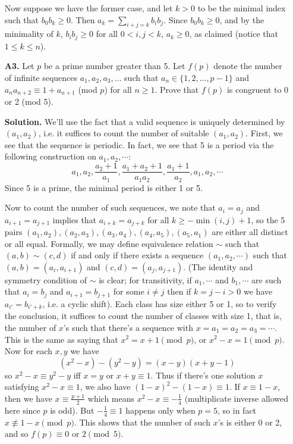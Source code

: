 \documentclass[11pt,a4paper]{article}
\begin{document}
\begin{enumerate}
        Now suppose we have the former case, and let $k>0$ to be the minimal index such that $b_0b_k\ge 0$. 
        Then $a_k = \sum_{i+j=k} b_ib_j$. 
        Since $b_0b_k\ge 0$, and by the minimality of $k$, $b_ib_j\ge 0$ for all $0<i, j<k$, 
        $a_k\ge 0$, as claimed (notice that $1\le k\le n$). 
		
		\item [\textbf{A3.}]
		Let $p$ be a prime number greater than 5. Let $f(p)$ denote the number of infinite sequences $a_1, a_2, a_3,\ldots$ such that $a_n \in \{1, 2,\ldots, p-1\}$ and $a_na_{n+2}\equiv1+a_{n+1}$ (mod $p$) for all $n\geq 1.$ Prove that $f(p)$ is congruent to 0 or 2 (mod 5).
		
		\textbf{Solution.} 
		We'll use the fact that a valid sequence is uniquely determined by $(a_1, a_2)$, i.e. it suffices to count the number of suitable $(a_1, a_2)$.
		First, we see that the sequence is periodic. 
		In fact, we see that 5 is a period via the following construction on $a_1, a_2, \cdots$:
		\[
		a_1, a_2, \frac{a_2 + 1}{a_1}, \frac{a_1 + a_2 + 1}{a_1a_2}, \frac{a_1 + 1}{a_2}, a_1, a_2, \cdots
		\]
		Since 5 is a prime, the minimal period is either 1 or 5.
		
		Now to count the number of such sequences, we note that $a_i=a_j$ and $a_{i+1}=a_{j+1}$ implies that $a_{i+k}=a_{j+k}$ for all $k\ge -\min(i, j) + 1$, 
		so the 5 pairs $(a_1, a_2), (a_2, a_3), (a_3, a_4), (a_4, a_5), (a_5, a_1)$ are either all distinct or all equal. 
		Formally, we may define equivalence relation $\sim$ such that $(a, b)\sim (c, d)$ if and only if there exists a sequence 
		$(a_1, a_2, \cdots)$ such that $(a, b)=(a_i, a_{i+1})$ and $(c, d)=(a_j, a_{j+1})$. 
		(The identity and symmetry condition of $\sim$ is clear; for transitivity, if $a_1, \cdots$ and $b_1, \cdots$ are such that $a_i=b_j$ and $a_{i+1}=b_{j+1}$ for some $i\neq j$ then if $k=j-i > 0$ we have $a_{i'}=b_{i'+k}$, 
		i.e. a cyclic shift). 
		Each class has size either 5 or 1, so to verify the conclusion, it suffices to count the number of classes with size 1, 
		that is, the number of $x$'s such that there's a sequence with $x=a_1=a_2=a_3=\cdots$. 
		This is the same as saying that $x^2=x+1\pmod{p}$, 
		or $x^2-x=1\pmod{p}$. 
		Now for each $x, y$ we have 
		\[
		(x^2-x)-(y^2-y)=(x-y)(x+y-1)
		\]
		so $x^2-x\equiv y^2-y$ iff $x=y$ or $x+y\equiv 1$. Thus if there's one solution $x$ satisfying $x^2-x\equiv 1$, 
		we also have $(1-x)^2-(1-x)\equiv 1$. If $x\equiv 1-x$, then we have $x\equiv \frac{p+1}{2}$ 
		which means $x^2-x\equiv -\frac 14$ (multiplicate inverse allowed here since $p$ is odd). 
		But $-\frac 14\equiv 1$ happens only when $p=5$, so in fact $x\not\equiv 1-x\pmod{p}$. 
		This shows that the number of such $x$'s is either 0 or 2, 
		and so $f(p)\equiv 0\text{ or }2\pmod{5}$. 
		

\end{enumerate}
\end{document}
